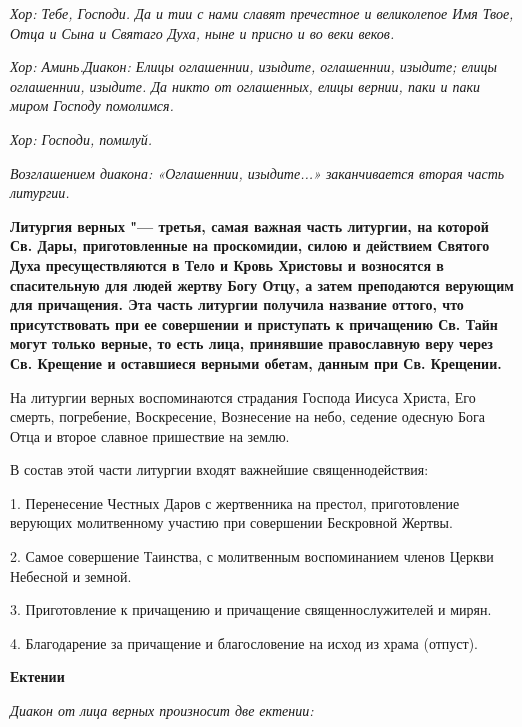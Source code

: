 \itshape Хор:\normalfont{} Тебе, Господи. Да и тии с нами славят пречестное и великолепое Имя Твое, Отца и Сына и Святаго Духа, ныне и присно и во веки веков.


\itshape Хор:\normalfont{} Аминь.\itshape  Диакон:\normalfont{} Елицы оглашеннии, изыдите, оглашеннии, изыдите; елицы оглашеннии, изыдите. Да никто от оглашенных, елицы вернии, паки и паки миром Господу помолимся.


\itshape Хор:\normalfont{} Господи, помилуй.


\itshape Возглашением диакона: «Оглашеннии, изыдите...» заканчивается вторая часть литургии.\normalfont{}\mychapterending

 


\bfseries Литургия верных\normalfont{} "--- третья, самая важная часть литургии, на которой Св. Дары, приготовленные на проскомидии, силою и действием Святого Духа пресуществляются в Тело и Кровь Христовы и возносятся в спасительную для людей жертву Богу Отцу, а затем преподаются верующим для причащения. Эта часть литургии получила название оттого, что присутствовать при ее совершении и приступать к причащению Св. Тайн могут только верные, то есть лица, принявшие православную веру через Св. Крещение и оставшиеся верными обетам, данным при Св. Крещении.



  На литургии верных воспоминаются страдания Господа Иисуса Христа, Его смерть, погребение, Воскресение, Вознесение на небо, седение одесную Бога Отца и второе славное пришествие на землю.


\medskip


В состав этой части литургии входят важнейшие священнодействия:


  1. Перенесение Честных Даров с жертвенника на престол, приготовление верующих молитвенному участию при совершении Бескровной Жертвы.


  2. Самое совершение Таинства, с молитвенным воспоминанием членов Церкви Небесной и земной. 


  3. Приготовление к причащению и причащение священнослужителей и мирян.


  4. Благодарение за причащение и благословение на исход из храма (отпуст).


\medskip


 \bfseries Ектении\normalfont{}


\itshape Диакон от лица верных произносит две ектении:\normalfont{}


